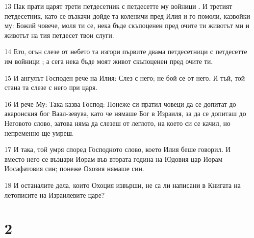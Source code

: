\par 13 Пак прати царят трети петдесетник с петдесетте му войници . И третият петдесетник, като се възкачи дойде та коленичи пред Илия и го помоли, казвойки му: Божий човече, моля ти се, нека бъде скъпоценен пред очите ти животът ми и животът на тия петдесет твои слуги.
\par 14 Ето, огън слезе от небето та изгори първите двама петдесетници с петдесетте им войници ; а сега нека бъде моят живот скъпоценен пред очите ти.
\par 15 И ангулът Господен рече на Илия: Слез с него; не бой се от него. И тъй, той стана та слезе с него при царя.
\par 16 И рече Му: Така казва Господ: Понеже си пратил човеци да се допитат до акаронския бог Ваал-зевува, като че нямаше Бог в Израиля, за да се допиташ до Неговото слово, затова няма да слезеш от леглото, на което си се качил, но непременно ще умреш.
\par 17 И така, той умря според Господното слово, което Илия беше говорил. И вместо него се възцари Иорам във втората година на Юдовия цар Иорам Иосафатовия син; понеже Охозия нямаше син.
\par 18 И останалите дела, които Охоция извърши, не са ли написани в Книгата на летописите на Израилевите царе?

\chapter{2}

